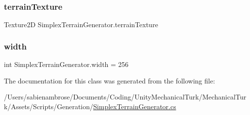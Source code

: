 \subsubsection{\texorpdfstring{terrain\+Texture}{terrainTexture}}
{\footnotesize\ttfamily Texture2D Simplex\+Terrain\+Generator.\+terrain\+Texture}

\mbox{\label{class_simplex_terrain_generator_acc680a118dccdeb8f2357b13c08563cf}} 
\subsubsection{\texorpdfstring{width}{width}}
{\footnotesize\ttfamily int Simplex\+Terrain\+Generator.\+width = 256}



The documentation for this class was generated from the following file\+:\begin{DoxyCompactItemize}
\item 
/\+Users/sabienambrose/\+Documents/\+Coding/\+Unity\+Mechanical\+Turk/\+Mechanical\+Turk/\+Assets/\+Scripts/\+Generation/\mbox{\hyperlink{_simplex_terrain_generator_8cs}{Simplex\+Terrain\+Generator.\+cs}}\end{DoxyCompactItemize}
